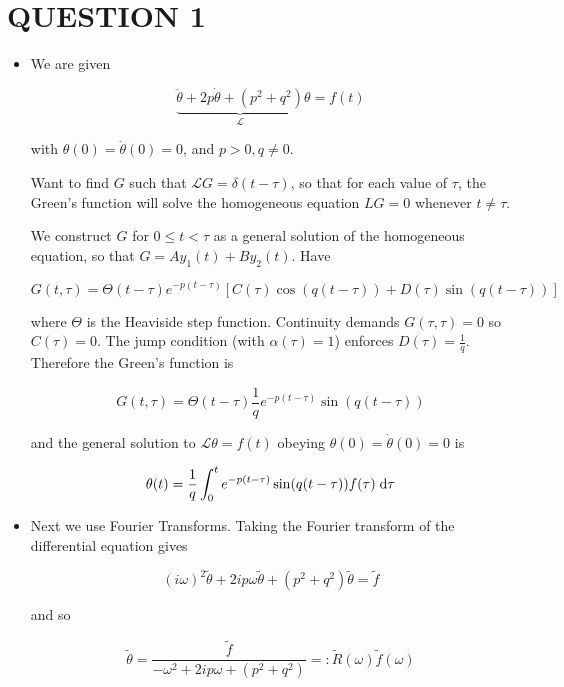 \documentclass[a4paper]{article}
\begin{document}
	
\maketitle

\section{QUESTION 1}

\begin{itemize}
	\item We are given
	
	\[ \underbrace{\ddot{\theta} + 2p \dot{\theta} + (p^{2} + q^{2})}_{\mathcal{L}}\theta = f(t) \]
	
	with $ \theta(0) = \dot{\theta}(0) = 0 $, and $ p > 0, q \neq 0 $.
	
	Want to find $ G $ such that $ \mathcal{L} G = \delta(t - \tau) $, so that for each value of $ \tau $, the Green's function will solve the homogeneous equation $ LG = 0 $ whenever $ t \neq \tau $.
	
	We construct $ G $ for $ 0 \leq t < \tau $ as a general solution of the homogeneous equation, so that $ G = Ay_{1}(t) + B y_{2}(t) $. 
	Have
	
	\[ G(t,\tau) = \Theta(t - \tau) e^{-p(t-\tau)}[ C(\tau)\cos(q(t-\tau)) + D(\tau) \sin(q(t-\tau))   ] \]
	
	where $ \Theta $ is the Heaviside step function. Continuity demands $ G(\tau,\tau) = 0 $ so $ C(\tau) = 0 $. The jump condition (with $ \alpha(\tau) = 1 $) enforces $ D(\tau) = \frac{1}{q} $. Therefore the Green's function is
	
	\[ G(t,\tau) = \Theta(t - \tau) \frac{1}{q} e^{-p(t - \tau)}\sin(q(t - \tau)) \]
	
	and the general solution to $ \mathcal{L}\theta = f(t) $ obeying $ \theta(0) = \dot{\theta}(0) = 0 $ is 
	
	\[ \theta(t) = \frac{1}{q} \int_{0}^{t} e^{-p(t - \tau)}\sin(q(t - \tau)) f(\tau) \; \mathrm{d} \tau  \]
	
	\item Next we use Fourier Transforms. Taking the Fourier transform of the differential equation gives 
	
	\[ (i \omega)^{2} \tilde{\theta} + 2 i p \omega \tilde{\theta} + (p^{2} + q^{2}) \tilde{\theta} = \tilde{f} \]
	
	and so
	
	\[ \tilde{\theta} = \frac{\tilde{f}}{-\omega^{2} + 2 i p \omega + (p^{2} + q^{2}) } = : \tilde{R}(\omega) \tilde{f}(\omega) \]
	

\end{itemize}
\end{document}
